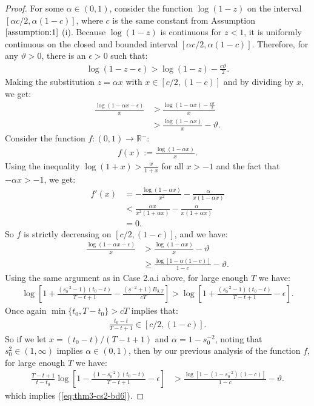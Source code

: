 \begin{proof}
For some $\alpha \in (0,1)$, consider the function $\log(1 - z)$ on the interval $[\alpha c/2, \alpha (1-c)]$, where $c$ is the same constant from Assumption $\ref{assumption:1}$ (i). Because $\log(1 - z)$ is continuous for $z < 1$, it is uniformly continuous on the closed and bounded interval $[\alpha c/2, \alpha (1-c)]$. Therefore, for any $\vartheta > 0$, there is an $\epsilon > 0$ such that:
\begin{align*}
     \log(1 - z - \epsilon) > \log(1 - z) - \frac{c \vartheta}{2}.
\end{align*}
Making the substitution $z = \alpha x$ with $x \in [c/2, (1-c)]$ and by dividing by $x$, we get:
\begin{align*}
     \frac{\log(1 - \alpha x - \epsilon)}{x} &> \frac{\log(1 - \alpha x) -\frac{c \vartheta}{2}}{x} \\
     &> \frac{\log(1 - \alpha x)}{x} - \vartheta. \tag{$x \geq c/2$}
\end{align*}
Consider the function $f: (0,1) \to \mathbb{R}^-$:
\begin{align*}
    f(x) := \frac{\log(1 - \alpha x)}{x}.
\end{align*}
Using the inequality $\log(1+x) > \frac{x}{1+x}$ for all $x > - 1$ and the fact that $-\alpha x > -1$, we get:
\begin{align*}
    f'(x) &= -\frac{\log(1 - \alpha x)}{x^2} - \frac{\alpha}{x(1 - \alpha x)} \\
    &< \frac{\alpha x }{x^2(1+\alpha x)} - \frac{\alpha}{x(1 + \alpha x)} \\
    &= 0.
\end{align*}
So $f$ is strictly decreasing on $[c/2, (1-c)]$, and we have:
\begin{align*}
     \frac{\log(1 - \alpha x - \epsilon)}{x} &> \frac{\log(1 - \alpha x)}{x} - \vartheta \\
     &\geq \frac{\log[1 - \alpha (1-c)]}{1-c} - \vartheta.
\end{align*}
Using the same argument as in Case 2.a.i above, for large enough $T$ we have:
\begin{align*}
     \log\left[1 + \frac{\left(s_0^{-2} -1\right)(t_0 - t)}{T - t + 1} - \frac{\left(\underline{s}^{-2} + 1\right) B_{3,T}}{cT} \right] > \log\left[1 + \frac{\left(s_0^{-2} -1\right)(t_0 - t)}{T - t + 1} - \epsilon\right].
\end{align*}
Once again $\min\{t_0,T-t_0\} > cT$ implies that: 
\begin{align*}
    \frac{t_0 - t}{T - t + 1} \in [c/2, (1-c)].
\end{align*}
So if we let $x = (t_0 - t)/(T - t + 1)$ and $\alpha = 1 - s_0^{-2}$, noting that $s_0^{2} \in (1,\infty)$ implies $\alpha \in (0,1)$, then by our previous analysis of the function $f$, for large enough $T$ we have:
\begin{align*}
    \frac{T-t+1}{t-t_0}\log\left[1 - \frac{\left(1- s_0^{-2}\right)(t_0 - t)}{T - t + 1} - \epsilon\right] &> \frac{\log[1 -  (1 -s_0^{-2})(1-c)]}{1-c} - \vartheta.
\end{align*}
which implies (\ref{eq:thm3-cs2-bd6}).


\end{proof}
